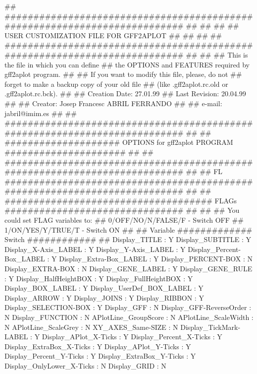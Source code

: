 \documentclass[11pt]{article}
\begin{document}
\nwenddocs{}\endmoddef
## ########################################################################## ##
##                                                                            ##
##                  USER CUSTOMIZATION FILE FOR GFF2APLOT                     ##
##                                                                            ##
## ########################################################################## ##
##
## This is the file in which you can define
##   the OPTIONS and FEATURES required by gff2aplot program.
## 
## If you want to modify this file, please, do not
##   forget to make a backup copy of your old file 
##   (like .gff2aplot.rc.old or .gff2aplot.rc.bck).
##
## Creation Date: 27.01.99
## Last Revision: 20.04.99
##
## Creator: Josep Francesc ABRIL FERRANDO
##
##  e-mail:        jabril@imim.es
##
## ########################################################################## ##
## #################### OPTIONS for gff2aplot PROGRAM ##################### ##
## ########################################################################## ##
##
FL ########################################################################## ##
## #################################### FLAGs ############################### ##
##
## You could set FLAG variables to:
##       0/OFF/NO/N/FALSE/F - Switch OFF
##       1/ON/YES/Y/TRUE/T  - Switch ON
##
## Variable ############# Switch ############
##
Display_TITLE             : Y
Display_SUBTITLE          : Y
Display_X-Axis_LABEL      : Y
Display_Y-Axis_LABEL      : Y
Display_Percent-Box_LABEL : Y
Display_Extra-Box_LABEL   : Y
Display_PERCENT-BOX       : N
Display_EXTRA-BOX         : N
Display_GENE_LABEL        : Y
Display_GENE_RULE         : Y
Display_HalfHeightBOX     : Y
Display_FullHeightBOX     : Y
Display_BOX_LABEL         : Y
Display_UserDef_BOX_LABEL : Y
Display_ARROW             : Y
Display_JOINS             : Y
Display_RIBBON            : Y
Display_SELECTION-BOX     : Y
Display_GFF               : N
Display_GFF-ReverseOrder  : N
Display_FUNCTION          : N
APlotLine_GroupScore      : N
APlotLine_ScaleWidth      : N
APlotLine_ScaleGrey       : N
XY_AXES_Same-SIZE         : N
Display_TickMark-LABEL    : Y
Display_APlot_X-Ticks     : Y
Display_Percent_X-Ticks   : Y
Display_ExtraBox_X-Ticks  : Y
Display_APlot_Y-Ticks     : Y
Display_Percent_Y-Ticks   : Y
Display_ExtraBox_Y-Ticks  : Y
Display_OnlyLower_X-Ticks : N
Display_GRID              : N
\end{document}
